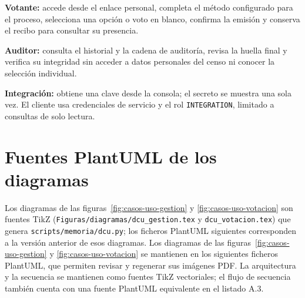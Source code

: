\textbf{Votante:} accede desde el enlace personal, completa el método
configurado para el proceso, selecciona una opción o voto en blanco, confirma
la emisión y conserva el recibo para consultar su presencia.

\textbf{Auditor:} consulta el historial y la cadena de auditoría, revisa la
huella final y verifica su integridad sin acceder a datos personales del censo
ni conocer la selección individual.

\textbf{Integración:} obtiene una clave desde la consola; el secreto se muestra
una sola vez. El cliente usa credenciales de servicio y el rol
\texttt{INTEGRATION}, limitado a consultas de solo lectura.

\section{Fuentes PlantUML de los diagramas}
\label{ap:fuentes-plantuml}

\ifdcunuevo
Los diagramas de las figuras~\ref{fig:casos-uso-gestion} y
\ref{fig:casos-uso-votacion} son fuentes TikZ (\texttt{Figuras/diagramas/dcu\_gestion.tex} y
\texttt{dcu\_votacion.tex}) que genera \texttt{scripts/memoria/dcu.py}; los ficheros PlantUML
siguientes corresponden a la versión anterior de esos diagramas.
\else
Los diagramas de las figuras~\ref{fig:casos-uso-gestion} y
\ref{fig:casos-uso-votacion} se mantienen en los siguientes ficheros
PlantUML, que permiten revisar y regenerar sus imágenes PDF.
\fi La arquitectura y la secuencia se mantienen como fuentes TikZ vectoriales; el flujo de secuencia también cuenta con una fuente PlantUML equivalente en el listado A.3.








